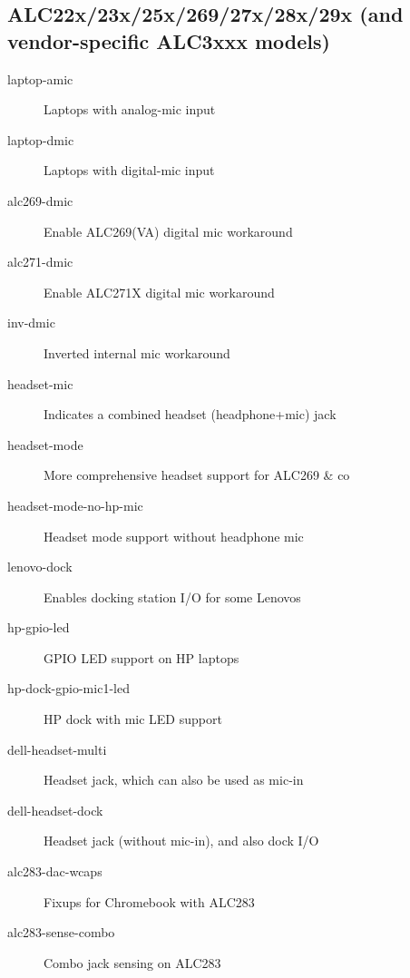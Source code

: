 \documentclass[a4paper,8pt,english]{sphinxmanual}
\begin{document}
\subsection{ALC22x/23x/25x/269/27x/28x/29x (and vendor-specific ALC3xxx models)}
\label{sound/hd-audio/models:alc22x-23x-25x-269-27x-28x-29x-and-vendor-specific-alc3xxx-models}\begin{description}
\item[{laptop-amic}] \leavevmode
Laptops with analog-mic input

\item[{laptop-dmic}] \leavevmode
Laptops with digital-mic input

\item[{alc269-dmic}] \leavevmode
Enable ALC269(VA) digital mic workaround

\item[{alc271-dmic}] \leavevmode
Enable ALC271X digital mic workaround

\item[{inv-dmic}] \leavevmode
Inverted internal mic workaround

\item[{headset-mic}] \leavevmode
Indicates a combined headset (headphone+mic) jack

\item[{headset-mode}] \leavevmode
More comprehensive headset support for ALC269 \& co

\item[{headset-mode-no-hp-mic}] \leavevmode
Headset mode support without headphone mic

\item[{lenovo-dock}] \leavevmode
Enables docking station I/O for some Lenovos

\item[{hp-gpio-led}] \leavevmode
GPIO LED support on HP laptops

\item[{hp-dock-gpio-mic1-led}] \leavevmode
HP dock with mic LED support

\item[{dell-headset-multi}] \leavevmode
Headset jack, which can also be used as mic-in

\item[{dell-headset-dock}] \leavevmode
Headset jack (without mic-in), and also dock I/O

\item[{alc283-dac-wcaps}] \leavevmode
Fixups for Chromebook with ALC283

\item[{alc283-sense-combo}] \leavevmode
Combo jack sensing on ALC283


\end{description}
\end{document}
